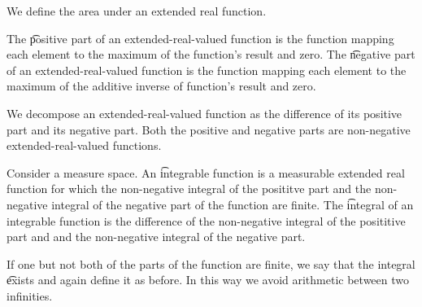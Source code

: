 
\sbasic

































\sstart
{}


We define the area under an extended real function.


The \t{positive part} of an extended-real-valued function is the function mapping each element to the maximum of the function's result and zero.
The \t{negative part} of an extended-real-valued function is the function mapping each element to the maximum of the additive inverse of function's result and zero.

We decompose an extended-real-valued function as the difference of its positive part and its negative part.
Both the positive and negative parts are non-negative extended-real-valued functions.

Consider a measure space.
An \t{integrable} function is a measurable extended real function for which the non-negative integral of the posititve part and the non-negative integral of the negative part of the function are finite.
The \t{integral} of an integrable function is the difference of the non-negative integral of the posititive part and and the non-negative integral of the negative part.

If one but not both of the parts of the function are finite, we say that the integral \t{exists} and again define it as before.
In this way we avoid arithmetic between two infinities.

